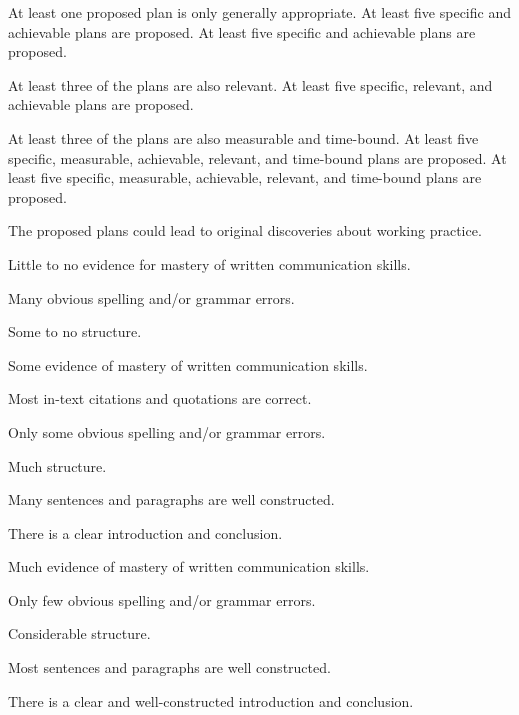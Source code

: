 \documentclass{../../fal_assignment}
\begin{document}
\begin{markingrubric}
%
        \grade \fail	At least one proposed plan is only generally appropriate. 
        \grade 		At least five specific and achievable plans are proposed. 
        \grade 		At least five specific and achievable plans are proposed. 
        \par 		At least three of the plans are also relevant.
        \grade 		At least five specific, relevant, and achievable plans are proposed. 
        \par 		At least three of the plans are also measurable and time-bound.
        \grade 		At least five specific, measurable, achievable, relevant, and time-bound plans are proposed. 
        \grade 		At least five specific, measurable, achievable, relevant, and time-bound plans are proposed. 
        \par 		The proposed plans could lead to original discoveries about working practice.
%
    
        \grade  \fail	Little to no evidence for mastery of written communication skills.
        \par 		Many obvious spelling and/or grammar errors.
        \par 		Some to no structure.
        
        \grade 		Some evidence of mastery of written communication skills.
        \par 		Most in-text citations and quotations are correct.
        \par 		Only some obvious spelling and/or grammar errors.
        \par 		Much structure.   
        \par 		Many sentences and paragraphs are well constructed.
        \par 		There is a clear introduction and conclusion.
        
        \grade 		Much evidence of mastery of written communication skills.

        \par 		Only few obvious spelling and/or grammar errors.
        \par 		Considerable structure.   
        \par 		Most sentences and paragraphs are well constructed.
        \par 		There is a clear and well-constructed introduction and conclusion.
        

\end{markingrubric}
\end{document}
